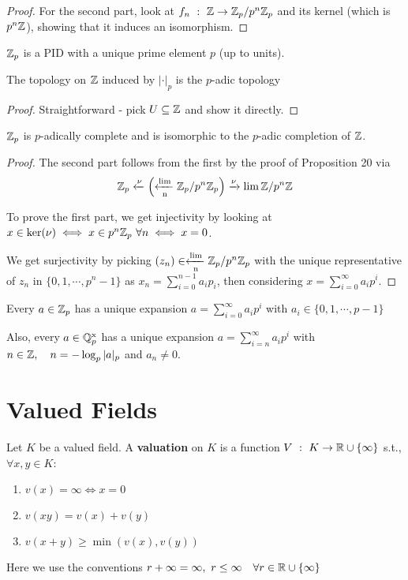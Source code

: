 \documentclass[a4paper]{article}
\begin{document}
{\begin{proof}
	For the second part, look at $f_n\ :\ \mathbb{Z}\to\mathbb{Z}_p/p^n\mathbb{Z}_p$ and its kernel (which is $p^n\mathbb{Z}$), showing that it induces an isomorphism.
\end{proof}

\begin{cor-num}
	$\mathbb{Z}_p$ is a PID with a unique prime element $p$ (up to units).
\end{cor-num}

\begin{prop-num}
	The topology on $\mathbb{Z}$ induced by $|\cdot|_p$ is the $p$-adic topology
\end{prop-num}
\begin{proof}
	Straightforward - pick $U\subseteq\mathbb{Z}$ and show it directly.
\end{proof}

\begin{prop-num}
	$\mathbb{Z}_p$ is $p$-adically complete and is isomorphic to the $p$-adic completion of $\mathbb{Z}$.
\end{prop-num}
\begin{proof}
	The second part follows from the first by the proof of Proposition 20 via
	\[
		\mathbb{Z}_p \xleftarrow{\nu} \left(\xleftarrow[\mathrm{n}]{\mathrm{lim}}\mathbb{Z}_p/p^n\mathbb{Z}_p\right) 
		     \xrightarrow{\nu} \lim\mathbb{Z}/p^n\mathbb{Z}
	\]
	
	To prove the first part, we get injectivity by looking at $x\in\ker(\nu)\iff x\in p^n\mathbb{Z}_p\ \forall n\iff x=0$.
	
	We get surjectivity by picking $(z_n)\in\xleftarrow[\mathrm{n}]{\mathrm{lim}}\mathbb{Z}_p/p^n\mathbb{Z}_p$ with the unique representative of $z_n$ in $\{0,1,\cdots,p^n-1\}$ as $x_n=\sum_{i=0}^{n-1}a_ip_i$, then considering $x=\sum_{i=0}^{\infty}a_ip^i$.
\end{proof}

\begin{cor-num}
	Every $a\in\mathbb{Z}_p$ has a unique expansion $a=\sum_{i=0}^{\infty}a_ip^i$ with $a_i\in\{0,1,\cdots,p-1\}$
	
	Also, every $a\in\mathbb{Q}_p^{\mathrm{x}}$ has a unique expansion $a=\sum_{i=n}^{\infty}a_ip^i$ with $n\in\mathbb{Z},\quad n=-\log_p|a|_p$ and $a_n\neq0$.
\end{cor-num}


\section{Valued Fields}

\begin{defi-num}[Valuation]
	Let $K$ be a valued field. A \textbf{valuation} on $K$ is a function $V\ :\ K\to\R\cup\{\infty\}$ s.t., $\forall x,y\in K$:
	\begin{enumerate}
		\item $v(x)=\infty \iff x=0$\\
		\item $v(xy)=v(x)+v(y)$\\
		\item $v(x+y)\geq\min(v(x),v(y))$
	\end{enumerate}
	Here we use the conventions $r+\infty=\infty,\ r\leq\infty\quad\forall r\in \mathbb{R}\cup\{\infty\}$
\end{defi-num}

}
\end{document}
